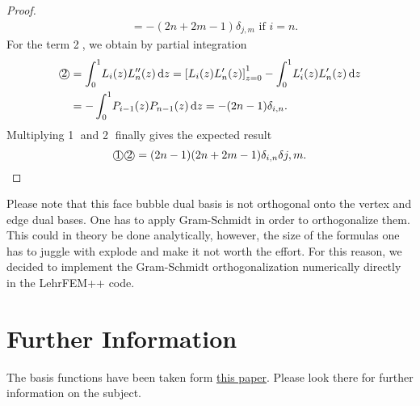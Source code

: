 \documentclass[10pt,a4paper]{article}
\begin{document}
\begin{proof}
\begin{align*}
            &= -(2n+2m-1)\delta_{j,m} \mbox{ if } i = n.
        \end{align*}
        For the term \textcircled{2}, we obtain by partial integration
        \begin{align*}
            \text{\textcircled{2}} &= \int_0^1\! L_i(z)L_n''(z) \,\mathrm{d}z = \left[ L_i(z)L_n'(z) \right]_{z=0}^1 - \int_0^1\! L_i'(z)L_n'(z) \,\mathrm{d}z \\
            &= -\int_0^1\! P_{i-1}(z)P_{n-1}(z) \,\mathrm{d}z = -(2n-1)\delta_{i,n}.
        \end{align*}
        Multiplying \textcircled{1} and \textcircled{2} finally gives the expected result
        \begin{equation*}
            \text{\textcircled{1}}\text{\textcircled{2}} = (2n-1)(2n+2m-1)\delta_{i,n}\delta{j,m}.
        \end{equation*}
    \end{proof}
    
    Please note that this face bubble dual basis is not orthogonal onto the vertex and edge dual bases. One has to apply Gram-Schmidt in order to orthogonalize them. This could in theory be done analytically, however, the size of the formulas one has to juggle with explode and make it not worth the effort. For this reason, we decided to implement the Gram-Schmidt orthogonalization numerically directly in the LehrFEM++ code.
    
\section{Further Information}
    
    The basis functions have been taken form \href{https://arxiv.org/pdf/1504.03025.pdf}{this paper}. Please look there for further information on the subject. 

    
\end{document}
